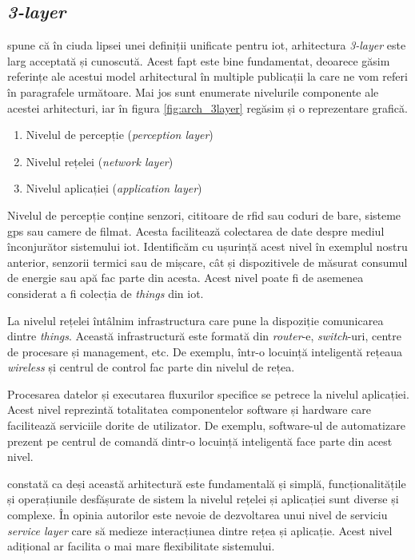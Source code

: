 \subsection*{\textit{3-layer}}

\citet{MiaoWu2010} spune că în ciuda lipsei unei definiții unificate pentru \acrshort{iot}, arhitectura \textit{3-layer} este larg acceptată și cunoscută. Acest fapt este bine fundamentat, deoarece găsim referințe ale acestui model arhitectural în multiple publicații la care ne vom referi în paragrafele următoare. Mai jos sunt enumerate nivelurile componente ale acestei arhitecturi, iar în figura \ref{fig:arch_3layer} regăsim și o reprezentare grafică.

\begin{enumerate}
    \item Nivelul de percepție (\textit{perception layer})
    \item Nivelul rețelei (\textit{network layer})
    \item Nivelul aplicației (\textit{application layer})
\end{enumerate}

Nivelul de percepție conține senzori, cititoare de \acrshort{rfid} sau coduri de bare, sisteme \acrfull{gps} sau camere de filmat. Acesta facilitează colectarea de date despre mediul înconjurător sistemului \acrshort{iot}. Identificăm cu ușurință acest nivel în exemplul nostru anterior, senzorii termici sau de mișcare, cât și dispozitivele de măsurat consumul de energie sau apă fac parte din acesta. Acest nivel poate fi de asemenea considerat a fi colecția de \textit{things} din \acrshort{iot}.

La nivelul rețelei întâlnim infrastructura care pune la dispoziție comunicarea dintre \textit{things}. Această infrastructură este formată din \textit{router}-e, \textit{switch}-uri, centre de procesare și management, etc. De exemplu, într-o locuință inteligentă rețeaua \textit{wireless} și centrul de control fac parte din nivelul de rețea.

Procesarea datelor și executarea fluxurilor specifice se petrece la nivelul aplicației. Acest nivel reprezintă totalitatea componentelor software și hardware care facilitează serviciile dorite de utilizator. De exemplu, software-ul de automatizare prezent pe centrul de comandă dintr-o locuință inteligentă face parte din acest nivel.

\citet{Lin2017} constată ca deși această arhitectură este fundamentală și simplă, funcționalitățile și operațiunile desfășurate de sistem la nivelul rețelei și aplicației sunt diverse și complexe. În opinia autorilor este nevoie de dezvoltarea unui nivel de serviciu \textit{service layer} care să medieze interacțiunea dintre rețea și aplicație. Acest nivel adițional ar facilita o mai mare flexibilitate sistemului.

